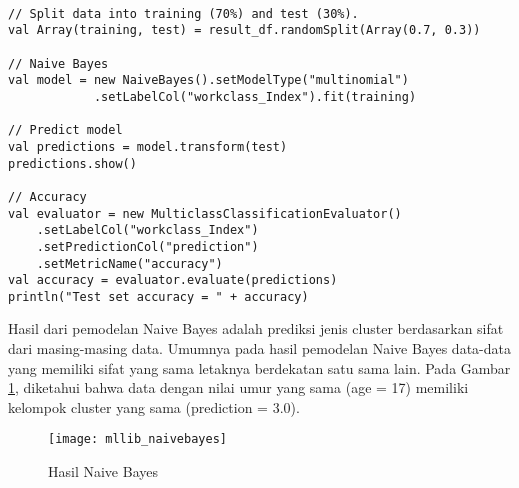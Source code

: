 \begin{lstlisting}[basicstyle=\ttfamily, frame=single,
	columns=fullflexible, keepspaces=true, breaklines=true, label=ls_kepatuhan_1_1_1_logo_sharif_judge, caption=Main method]
	
// Split data into training (70%) and test (30%).
val Array(training, test) = result_df.randomSplit(Array(0.7, 0.3))

// Naive Bayes
val model = new NaiveBayes().setModelType("multinomial")
			.setLabelCol("workclass_Index").fit(training)
			
// Predict model
val predictions = model.transform(test)
predictions.show()

// Accuracy
val evaluator = new MulticlassClassificationEvaluator()
	.setLabelCol("workclass_Index")
	.setPredictionCol("prediction")
	.setMetricName("accuracy")
val accuracy = evaluator.evaluate(predictions)
println("Test set accuracy = " + accuracy)

\end{lstlisting}
\vspace{0.5cm}
\noindent Hasil dari pemodelan Naive Bayes adalah prediksi jenis cluster berdasarkan sifat dari masing-masing data. Umumnya pada hasil pemodelan Naive Bayes data-data yang memiliki sifat yang sama letaknya berdekatan satu sama lain. Pada Gambar \ref{fig:mllib_naivebayes}, diketahui bahwa data dengan nilai umur yang sama (age = 17) memiliki kelompok cluster yang sama (prediction = 3.0).

\begin{figure}[H]
	\centering
	\texttt{[image: mllib\_naivebayes]}
	\caption{Hasil Naive Bayes}
	\label{fig:mllib_naivebayes}
\end{figure}


